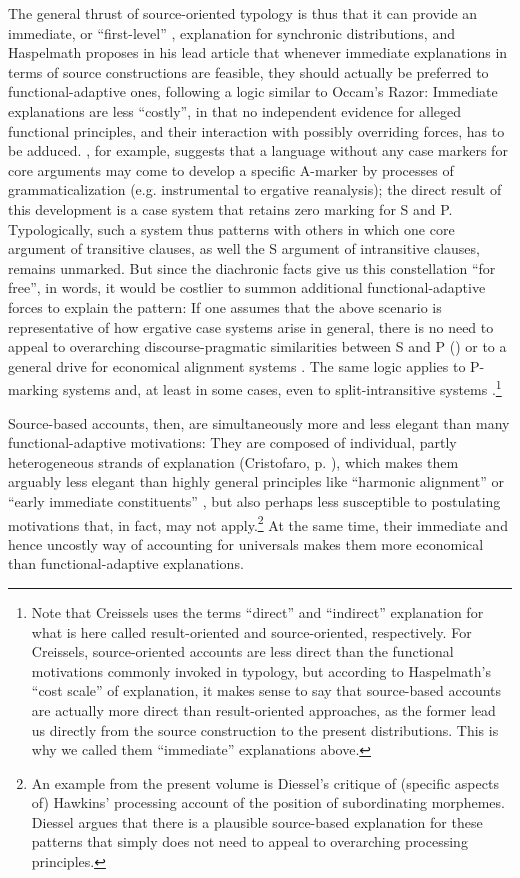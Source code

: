 \documentclass[output=paper]{langsci/langscibook}
\begin{document}
The general thrust of source-oriented typology is thus that it can provide an immediate, or “first-level” \citep[1]{Creissels2008}, explanation for synchronic distributions, and Haspelmath proposes in his lead article that whenever immediate explanations in terms of source constructions are feasible, they should actually be preferred to functional-adaptive ones, following a logic similar to Occam’s Razor: Immediate explanations are less “costly”, in that no independent evidence for alleged functional principles, and their interaction with possibly overriding forces, has to be adduced. \citet{Cristofaro2014}, for example, suggests that a language without any case markers for core arguments may come to develop a specific A-marker by processes of grammaticalization (e.g. instrumental to ergative reanalysis); the direct result of this development is a case system that retains zero marking for S and P. Typologically, such a system thus patterns with others in which one core argument of transitive clauses, as well the S argument of intransitive clauses, remains unmarked. But since the diachronic facts give us this constellation “for free”, in  words, it would be costlier to summon additional functional-adaptive forces to explain the pattern: If one assumes that the above scenario is representative of how ergative case systems arise in general, there is no need to appeal to overarching discourse-pragmatic similarities between S and P (\citealt{DuBois1987}) or to a general drive for economical alignment systems \citep{Comrie1989}. The same logic applies to P-marking systems and, at least in some cases, even to split-intransitive systems \citep{Creissels2008}.\footnote{Note that Creissels uses the terms “direct” and “indirect” explanation for what is here called result-oriented and source-oriented, respectively. For Creissels, source-oriented accounts are less direct than the functional motivations commonly invoked in typology, but according to Haspelmath’s “cost scale” of explanation, it makes sense to say that source-based accounts are actually more direct than result-oriented approaches, as the former lead us directly from the source construction to the present distributions. This is why we called them “immediate” explanations above.} 

Source-based accounts, then, are simultaneously more and less elegant than many functional-adaptive motivations: They are composed of individual, partly heterogeneous strands of explanation (Cristofaro, p. \pageref{p:cristofaro:strands}), which makes them arguably less elegant than highly general principles like “harmonic alignment” \citep{Aissen2003} or “early immediate constituents” \citep{Hawkins1994}, but also perhaps less susceptible to postulating motivations that, in fact, may not apply.\footnote{An example from the present volume is Diessel’s critique of (specific aspects of) Hawkins’ processing account of the position of subordinating morphemes. Diessel argues that there is a plausible source-based explanation for these patterns that simply does not need to appeal to overarching processing principles.} At the same time, their immediate and hence uncostly way of accounting for universals makes them more economical than functional-adaptive explanations. 
\end{document}
